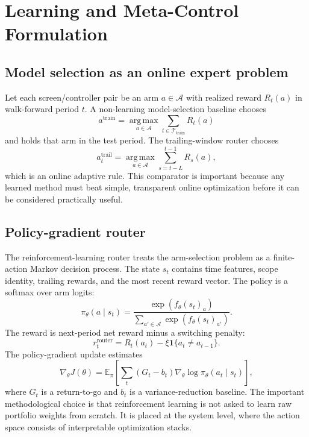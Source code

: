 \documentclass[11pt,a4paper]{article}
\newcommand{\E}{\mathbb{E}}
\newcommand{\argmax}{\operatorname*{arg\,max}}
\begin{document}
\section{Learning and Meta-Control Formulation}
\subsection{Model selection as an online expert problem}
Let each screen/controller pair be an arm $a\in\mathcal{A}$ with realized reward $R_t(a)$ in walk-forward period $t$. A non-learning model-selection baseline chooses
\begin{equation}
a^{\text{train}}=\argmax_{a\in\mathcal{A}}\sum_{t\in\mathcal{T}_{\text{train}}}R_t(a)
\end{equation}
and holds that arm in the test period. The trailing-window router chooses
\begin{equation}
a_t^{\text{trail}}=\argmax_{a\in\mathcal{A}}\sum_{s=t-L}^{t-1}R_s(a),
\end{equation}
which is an online adaptive rule. This comparator is important because any learned method must beat simple, transparent online optimization before it can be considered practically useful.

\subsection{Policy-gradient router}
The reinforcement-learning router treats the arm-selection problem as a finite-action Markov decision process. The state $s_t$ contains time features, scope identity, trailing rewards, and the most recent reward vector. The policy is a softmax over arm logits:
\begin{equation}
\pi_\theta(a\mid s_t)=\frac{\exp(f_\theta(s_t)_a)}{\sum_{a'\in\mathcal{A}}\exp(f_\theta(s_t)_{a'})}.
\end{equation}
The reward is next-period net reward minus a switching penalty:
\begin{equation}
r_t^{\text{router}}=R_t(a_t)-\xi\mathbf{1}\{a_t\ne a_{t-1}\}.
\end{equation}
The policy-gradient update estimates
\begin{equation}
\nabla_\theta J(\theta)=\E_\pi\left[\sum_t (G_t-b_t)\nabla_\theta\log\pi_\theta(a_t\mid s_t)\right],
\label{eq:policy_gradient}
\end{equation}
where $G_t$ is a return-to-go and $b_t$ is a variance-reduction baseline. The important methodological choice is that reinforcement learning is not asked to learn raw portfolio weights from scratch. It is placed at the system level, where the action space consists of interpretable optimization stacks.
\end{document}
